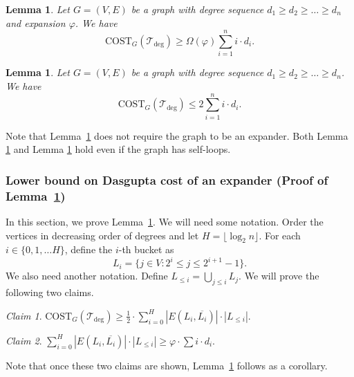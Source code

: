 \documentclass[letterpaper,11pt]{article}
\newcommand{\tdeg}{\mathcal{T}_{\deg}}
\newcommand{\CT}{\text{COST}}
\theoremstyle{plain}
\newtheorem{lemma}[theorem]{Lemma}
\theoremstyle{definition}
\theoremstyle{remark}
\newtheorem{claim}{Claim}
\begin{document}
\begin{lemma} \label{lem:dcost:lb}
	Let $G = (V,E)$ be a graph with degree sequence $d_1 \geq d_2 \geq \ldots \geq d_n$
	and expansion $\varphi$. We have
	$$\CT_G(\tdeg) \geq \Omega(\varphi) \sum_{i=1}^{n} i \cdot d_i \text{.}$$
\end{lemma}

\begin{lemma} \label{lem:dcost:ub}
	Let $G = (V,E)$ be a graph with degree sequence $d_1 \geq d_2 \geq \ldots \geq d_n$. We have
	$$\CT_G(\tdeg) \leq 2 \sum_{i=1}^n i \cdot d_i.$$
\end{lemma}

Note that Lemma~\ref{lem:dcost:ub} does not require the graph to be an expander. Both Lemma \ref{lem:dcost:lb} and Lemma \ref{lem:dcost:ub} hold even if the graph has self-loops.  

\subsubsection{Lower bound on Dasgupta cost of an expander (Proof of Lemma~\ref{lem:dcost:lb})}

In this section, we prove Lemma~\ref{lem:dcost:lb}. We will need some notation. Order the vertices
in decreasing order of degrees and let $H = \lfloor \log_2 n \rfloor$. 
For each $i \in \{0,1, \ldots H\}$, define the $i$-th
bucket as $$L_i = \{j \in V : 2^i \leq j \leq 2^{i+1} - 1 \}.$$ We also need another notation.
Define $L_{\leq i} = \bigcup_{j \leq i} L_j$. We will prove the following two claims.

\begin{claim} \label{clm:lb:aux}
	$\CT_G(\tdeg) \geq \frac{1}{2} \cdot \sum_{i = 0}^{H} |E(L_i, \overline{L_i})| \cdot |L_{\leq i}|$.
\end{claim}


\begin{claim} \label{clm:lb:final}
	$\sum_{i = 0}^{H} |E(L_i, \overline{L_i})| \cdot |L_{\leq i}| \geq \varphi \cdot \sum i \cdot  d_i$.
\end{claim}

Note that once these two claims are shown, Lemma~\ref{lem:dcost:lb} follows as a corollary.
\end{document}
